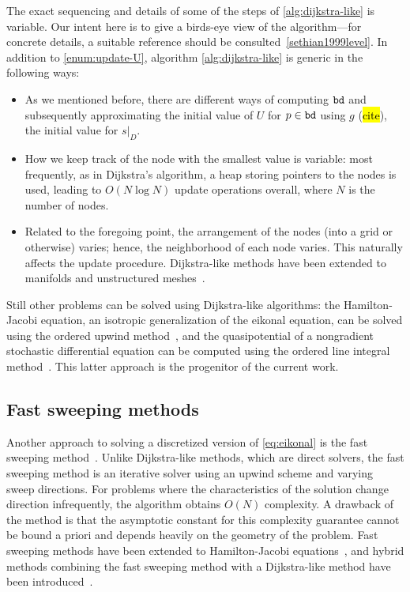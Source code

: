 \documentclass[eikonal.tex]{subfiles}
\begin{document}
The exact sequencing and details of some of the steps of
\cref{alg:dijkstra-like} is variable. Our intent here is to give a
birds-eye view of the algorithm---for concrete details, a suitable
reference should be consulted~\cref{sethian1999level}. In addition to
\cref{enum:update-U}, algorithm \cref{alg:dijkstra-like} is generic in
the following ways:
\begin{itemize}
\item As we mentioned before, there are different ways of computing
  $\texttt{bd}$ and subsequently approximating the initial value of $U$
  for $p \in \texttt{bd}$ using $g$ (\hl{cite}), the initial value for
  $\left. s \right|_D$.
\item How we keep track of the node with the smallest value is
  variable: most frequently, as in Dijkstra's algorithm, a heap
  storing pointers to the nodes is used, leading to $O(N \log N)$
  update operations overall, where $N$ is the number of nodes.
\item Related to the foregoing point, the arrangement of the nodes
  (into a grid or otherwise) varies; hence, the neighborhood of each
  node varies. This naturally affects the update
  procedure. Dijkstra-like methods have been extended to manifolds and
  unstructured meshes~\cite{sethian2000fast}.
\end{itemize}
Still other problems can be solved using Dijkstra-like algorithms: the
Hamilton-Jacobi equation, an isotropic generalization of the eikonal
equation, can be solved using the ordered upwind
method~\cite{sethian2003ordered}, and the quasipotential of a
nongradient stochastic differential equation can be computed using the
ordered line integral method~\cite{dahiya2017ordered}. This latter
approach is the progenitor of the current work.

\subsection{Fast sweeping methods} Another approach to solving a
discretized version of \cref{eq:eikonal} is the fast sweeping
method~\cite{tsai2003fast,zhao2005fast}. Unlike Dijkstra-like methods,
which are direct solvers, the fast sweeping method is an iterative
solver using an upwind scheme and varying sweep directions. For
problems where the characteristics of the solution change direction
infrequently, the algorithm obtains $O(N)$ complexity. A drawback of
the method is that the asymptotic constant for this complexity
guarantee cannot be bound a priori and depends heavily on the geometry
of the problem. Fast sweeping methods have been extended to
Hamilton-Jacobi equations~\cite{kao2004lax,tsai2003fast}, and hybrid
methods combining the fast sweeping method with a Dijkstra-like method
have been introduced~\cite{chacon2012fast,chacon2015parallel}.
\end{document}
